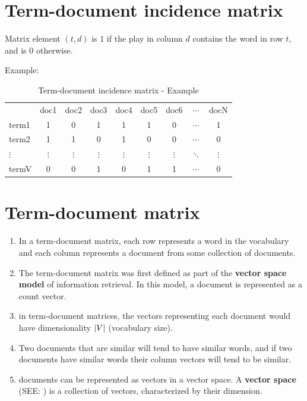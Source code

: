 \section{Term-document incidence matrix \cite{ir-1}}\label{Term-document incidence matrix}

Matrix element $(t, d)$ is $1$ if the play in column $d$ contains the word in row $t$, and is $0$ otherwise.

Example:
\begin{table}[h]
    \centering
    \begin{tabular}{l c c c c c c c c}
         & doc1 & doc2 & doc3 & doc4 & doc5 & doc6 & $\cdots$ & docN \\
        term1 & 1 & 0 & 1 & 1 & 1 & 0 & $\cdots$ & 1 \\ 
        term2 & 1 & 1 & 0 & 1 & 0 & 0 & $\cdots$ & 0 \\ 
        $\vdots$ & $\vdots$ & $\vdots$ & $\vdots$ & $\vdots$ & $\vdots$ & $\vdots$ & $\ddots$ & $\vdots$ \\
        termV & 0 & 0 & 1 & 0 & 1 & 1 & $\cdots$ & 0 \\ 
    \end{tabular}
    \caption{Term-document incidence matrix - Example}
\end{table}



\section{Term-document matrix \cite{nlp-1}}\label{Term-document matrix}

\begin{enumerate}
    \item In a term-document matrix, each row represents a word in the vocabulary and each column represents a document from some collection of documents.
    
    \item The term-document matrix was first defined as part of the \textbf{vector space model} of information retrieval. In this model, a document is represented as a count vector.

    \item in term-document matrices, the vectors representing each document would have dimensionality $\left| V \right|$ (vocabulary size).

    \item Two documents that are similar will tend to have similar words, and if two documents have similar words their column vectors will tend to be similar.

    \item documents can be represented as vectors in a vector space. A \textbf{vector space} (SEE: ) is a collection of vectors, characterized by their dimension.
\end{enumerate}


